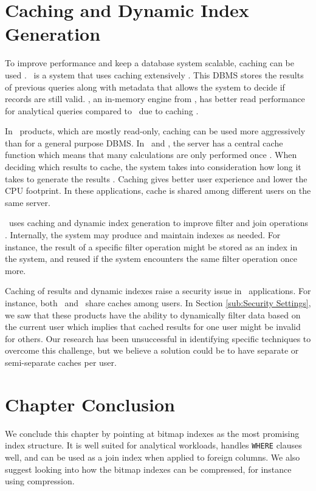 \section{Caching and Dynamic Index Generation}
\label{sec:Caching and Dynamic Index Generation}
To improve performance and keep a database system scalable, caching can be used \cite{Plattner2014-fr}. \exasol~is a system that uses caching extensively \cite{Exasol2014-xh}. This DBMS stores the results of previous queries along with metadata that allows the system to decide if records are still valid. , an in-memory engine from , has better read performance for analytical queries compared to \mssql~due to caching \cite{Ferrari2012-hm}.

In \bd~products, which are mostly read-only, caching can be used more aggressively than for a general purpose DBMS. In \qlikview~and \tableau, the server has a central cache function which means that many calculations are only performed once \cite{Kamkolkar2015-iq, Qlik2011-ef}. When deciding which results to cache, the system takes into consideration how long it takes to generate the results \cite{noauthor_undated-js}. Caching gives better user experience and lower the CPU footprint. In these applications, cache is shared among different users on the same server.

\exasol~uses caching and dynamic index generation to improve filter and join operations \cite{Exasol2014-xh}. Internally, the system may produce and maintain indexes as needed. For instance, the result of a specific filter operation might be stored as an index in the system, and reused if the system encounters the same filter operation once more.

Caching of results and dynamic indexes raise a security issue in \bd~applications. For instance, both \qlikview~and \tableau~share caches among users. In Section \ref{sub:Security Settings}, we saw that these products have the ability to dynamically filter data based on the current user which implies that cached results for one user might be invalid for others. Our research has been unsuccessful in identifying specific techniques to overcome this challenge, but we believe a solution could be to have separate or semi-separate caches per user.

\section{Chapter Conclusion}
\label{sec:Chapter Conclusion}
We conclude this chapter by pointing at bitmap indexes as the most promising index structure. It is well suited for analytical workloads, handles \texttt{WHERE} clauses well, and can be used as a join index when applied to foreign columns. We also suggest looking into how the bitmap indexes can be compressed, for instance using  compression.

